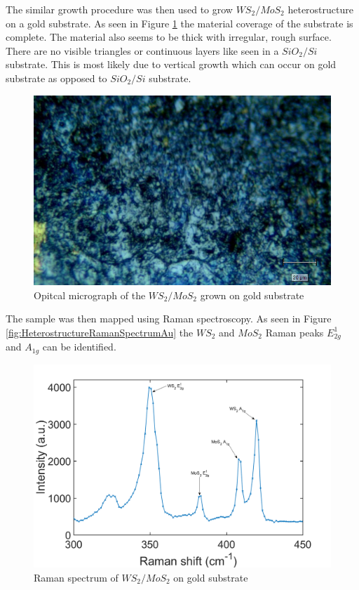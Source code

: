The similar growth procedure was then used to grow $WS_2/MoS_2$ heterostructure on a gold substrate. As seen in Figure \ref{fig:HeterostructuresOMAu} the material coverage of the substrate is complete. The material also seems to be thick with irregular, rough surface. There are no visible triangles or continuous layers like seen in a $SiO_2/Si$ substrate. This is most likely due to vertical growth which can occur on gold substrate as opposed to $SiO_2/Si$ substrate.

\begin{figure}[h]
	\begin{center}
		\includegraphics[scale=0.3]{Heterostructures/OMAu.png}
		\caption{Opitcal micrograph of the $WS_2/MoS_2$ grown on gold substrate}
		\label{fig:HeterostructuresOMAu}
	\end{center}
\end{figure}

The sample was then mapped using Raman spectroscopy. As seen in Figure \ref{fig:HeterostructureRamanSpectrumAu} the $WS_2$ and $MoS_2$ Raman peaks $E^1_{2g}$ and $A_{1g}$ can be identified.

\begin{figure}[h]
	\begin{center}
		\includegraphics[scale=0.3]{Heterostructures/RamanSpectrumAu.png}
		\caption{Raman spectrum of $WS_2/MoS_2$ on gold substrate}
		\label{fig:HeterostructuresRamanSpectrumAu}
	\end{center}
\end{figure}

